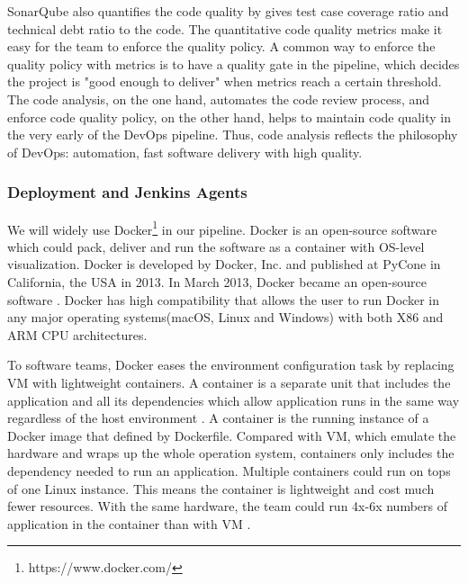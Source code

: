 SonarQube also quantifies the code quality by gives test case coverage ratio and technical debt ratio to the code. The quantitative code quality metrics make it easy for the team to enforce the quality policy. A common way to enforce the quality policy with metrics is to have a quality gate in the pipeline, which decides the project is "good enough to deliver" when metrics reach a certain threshold.
The code analysis, on the one hand, automates the code review process, and enforce code quality policy, on the other hand, helps to maintain code quality in the very early of the DevOps pipeline. Thus, code analysis reflects the philosophy of DevOps: automation, fast software delivery with high quality.
\subsubsection{Deployment and Jenkins Agents}
We will widely use Docker\footnote{https://www.docker.com/} in our pipeline. Docker is an open-source software which could pack, deliver and run the software as a container with OS-level visualization. Docker is developed by Docker, Inc. and published at PyCone in California, the USA in 2013. In March 2013, Docker became an open-source software \cite{avram2013docker}. Docker has high compatibility that allows the user to run Docker in any major operating systems(macOS, Linux and Windows) with both X86 and ARM CPU architectures.
\par
To software teams, Docker eases the environment configuration task by replacing VM with lightweight containers.
A container is a separate unit that includes the application and all its dependencies which allow application runs in the same way regardless of the host environment \cite{WhatisaC60:online}. A container is the running instance of a Docker image that defined by Dockerfile. Compared with VM, which emulate the hardware and wraps up the whole operation system, containers only includes the dependency needed to run an application. Multiple containers could run on tops of one Linux instance. This means the container is lightweight and cost much fewer resources. With the same hardware, the team could run 4x-6x numbers of application in the container than with VM \cite{vaughan2014docker}.

